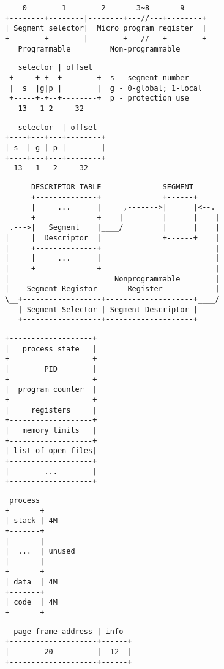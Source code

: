 \documentclass[varwidth,crop,multi={verbatim}]{standalone}
\begin{document}
\begin{verbatim}
    0        1        2       3~8       9
+--------+--------|--------+---//---+--------+
| Segment selector|  Micro program register  |
+--------+--------|--------+---//---+--------+
   Programmable         Non-programmable
\end{verbatim}

\begin{verbatim}
   selector | offset
 +-----+-+--+--------+  s - segment number
 |  s  |g|p |        |  g - 0-global; 1-local
 +-----+-+--+--------+  p - protection use
   13   1 2     32
\end{verbatim}

\begin{verbatim}
   selector  | offset
+----+---+---+--------+
| s  | g | p |        |
+----+---+---+--------+
  13   1   2     32
\end{verbatim}

\begin{verbatim}
      DESCRIPTOR TABLE              SEGMENT
      +--------------+              +------+
      |     ...      |     ,------->|      |<--.
      +--------------+    |         |      |    |
 .--->|   Segment    |____/         |      |    |
|     |  Descriptor  |              +------+    |
|     +--------------+                          |
|     |     ...      |                          |
|     +--------------+                          |
|                        Nonprogrammable        |
|    Segment Registor       Register            |
\__+------------------+--------------------+____/
   | Segment Selector | Segment Descriptor |
   +------------------+--------------------+
\end{verbatim}

\begin{verbatim}
+-------------------+
|   process state   |
+-------------------+
|        PID        |
+-------------------+
|  program counter  |
+-------------------+
|     registers     |
+-------------------+
|   memory limits   |
+-------------------+
| list of open files|
+-------------------+
|        ...        |
+-------------------+
\end{verbatim}

\begin{verbatim}
 process 
+-------+
| stack | 4M
+-------+
|       |
|  ...  | unused
|       |
+-------+
| data  | 4M
+-------+
| code  | 4M
+-------+
\end{verbatim}

\begin{verbatim}
  page frame address | info                                     
+--------------------+------+
|        20          |  12  | 
+--------------------+------+
\end{verbatim}
\end{document}
